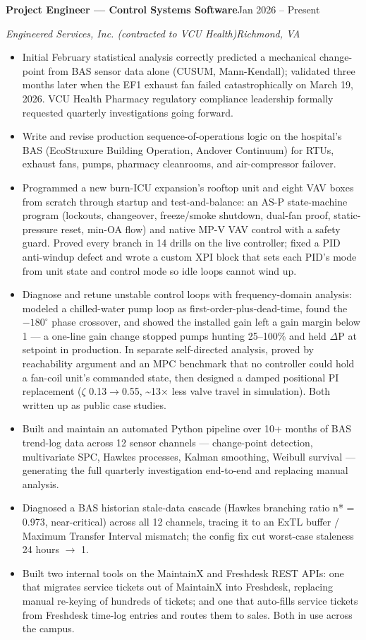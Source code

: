 \documentclass[letterpaper,9pt]{extarticle}
\newcommand{\entry}[2]{%
  \textbf{#1}\hfill#2\par}
\newcommand{\subentry}[2]{%
  \textit{#1}\hfill\textit{#2}\par\vspace{0.2ex}}
\begin{document}
\entry{Project Engineer --- Control Systems Software}{Jan 2026 -- Present}
\subentry{Engineered Services, Inc. (contracted to VCU Health)}{Richmond, VA}
\begin{itemize}
  \item Initial February statistical analysis correctly predicted a mechanical change-point from BAS sensor data alone (CUSUM, Mann-Kendall); validated three months later when the EF1 exhaust fan failed catastrophically on March 19, 2026. VCU Health Pharmacy regulatory compliance leadership formally requested quarterly investigations going forward.
  \item Write and revise production sequence-of-operations logic on the hospital's BAS (EcoStruxure Building Operation, Andover Continuum) for RTUs, exhaust fans, pumps, pharmacy cleanrooms, and air-compressor failover.
  \item Programmed a new burn-ICU expansion's rooftop unit and eight VAV boxes from scratch through startup and test-and-balance: an AS-P state-machine program (lockouts, changeover, freeze/smoke shutdown, dual-fan proof, static-pressure reset, min-OA flow) and native MP-V VAV control with a safety guard. Proved every branch in 14 drills on the live controller; fixed a PID anti-windup defect and wrote a custom XPI block that sets each PID's mode from unit state and control mode so idle loops cannot wind up.
  \item Diagnose and retune unstable control loops with frequency-domain analysis: modeled a chilled-water pump loop as first-order-plus-dead-time, found the $-180^\circ$ phase crossover, and showed the installed gain left a gain margin below 1 --- a one-line gain change stopped pumps hunting 25--100\% and held $\Delta$P at setpoint in production. In separate self-directed analysis, proved by reachability argument and an MPC benchmark that no controller could hold a fan-coil unit's commanded state, then designed a damped positional PI replacement ($\zeta$ 0.13$\to$0.55, \textasciitilde13$\times$ less valve travel in simulation). Both written up as public case studies.
  \item Built and maintain an automated Python pipeline over 10+ months of BAS trend-log data across 12 sensor channels --- change-point detection, multivariate SPC, Hawkes processes, Kalman smoothing, Weibull survival --- generating the full quarterly investigation end-to-end and replacing manual analysis.
  \item Diagnosed a BAS historian stale-data cascade (Hawkes branching ratio n* = 0.973, near-critical) across all 12 channels, tracing it to an ExTL buffer / Maximum Transfer Interval mismatch; the config fix cut worst-case staleness 24 hours $\to$ 1.
  \item Built two internal tools on the MaintainX and Freshdesk REST APIs: one that migrates service tickets out of MaintainX into Freshdesk, replacing manual re-keying of hundreds of tickets; and one that auto-fills service tickets from Freshdesk time-log entries and routes them to sales. Both in use across the campus.
\end{itemize}
\end{document}
